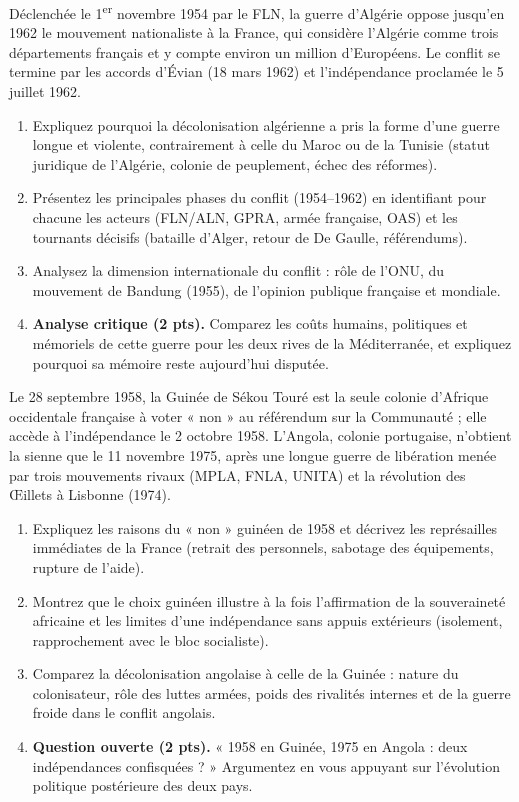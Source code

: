 \documentclass[11pt]{article}
\begin{document}
\begin{exercice}
Déclenchée le 1\textsuperscript{er} novembre 1954 par le FLN, la guerre d'Algérie oppose jusqu'en 1962 le mouvement nationaliste à la France, qui considère l'Algérie comme trois départements français et y compte environ un million d'Européens. Le conflit se termine par les accords d'Évian (18 mars 1962) et l'indépendance proclamée le 5 juillet 1962.
\begin{enumerate}
\item Expliquez pourquoi la décolonisation algérienne a pris la forme d'une guerre longue et violente, contrairement à celle du Maroc ou de la Tunisie (statut juridique de l'Algérie, colonie de peuplement, échec des réformes).
\item Présentez les principales phases du conflit (1954--1962) en identifiant pour chacune les acteurs (FLN/ALN, GPRA, armée française, OAS) et les tournants décisifs (bataille d'Alger, retour de De Gaulle, référendums).
\item Analysez la dimension internationale du conflit : rôle de l'ONU, du mouvement de Bandung (1955), de l'opinion publique française et mondiale.
\item \textbf{Analyse critique (2 pts).} Comparez les coûts humains, politiques et mémoriels de cette guerre pour les deux rives de la Méditerranée, et expliquez pourquoi sa mémoire reste aujourd'hui disputée.
\end{enumerate}
\end{exercice}

\begin{exercice}
Le 28 septembre 1958, la Guinée de Sékou Touré est la seule colonie d'Afrique occidentale française à voter « non » au référendum sur la Communauté ; elle accède à l'indépendance le 2 octobre 1958. L'Angola, colonie portugaise, n'obtient la sienne que le 11 novembre 1975, après une longue guerre de libération menée par trois mouvements rivaux (MPLA, FNLA, UNITA) et la révolution des Œillets à Lisbonne (1974).
\begin{enumerate}
\item Expliquez les raisons du « non » guinéen de 1958 et décrivez les représailles immédiates de la France (retrait des personnels, sabotage des équipements, rupture de l'aide).
\item Montrez que le choix guinéen illustre à la fois l'affirmation de la souveraineté africaine et les limites d'une indépendance sans appuis extérieurs (isolement, rapprochement avec le bloc socialiste).
\item Comparez la décolonisation angolaise à celle de la Guinée : nature du colonisateur, rôle des luttes armées, poids des rivalités internes et de la guerre froide dans le conflit angolais.
\item \textbf{Question ouverte (2 pts).} « 1958 en Guinée, 1975 en Angola : deux indépendances confisquées ? » Argumentez en vous appuyant sur l'évolution politique postérieure des deux pays.
\end{enumerate}
\end{exercice}
\end{document}
